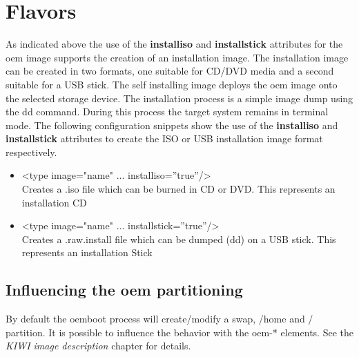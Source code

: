 \section{Flavors}

As indicated above the use of the \textbf{installiso} and \textbf{installstick}
 attributes for the oem image supports the creation of an installation image.
The installation image can be created in two formats, one suitable for
CD/DVD media and a second suitable for a USB stick. The self installing
image deploys the oem image onto the selected storage device. The
installation process is a simple image dump using the dd command. During
this process the target system
remains in terminal mode. The following configuration snippets show the 
use of the \textbf{installiso} and \textbf{installstick} attributes
to create the ISO or USB installation image format respectively.

\begin{itemize}
\item <type image="name" ... installiso=''true''/>\\
      Creates a .iso file which can be burned in CD or DVD. This
      represents an installation CD
\item <type image="name" ... installstick=''true''/>\\
      Creates a .raw.install file which can be dumped (dd) on a
      USB stick. This represents an installation Stick
\end{itemize}

\subsection{Influencing the oem partitioning}

By default the oemboot process will create/modify a swap, /home and /
partition. It is possible to influence the behavior with the
oem-* elements. See the \textit{KIWI image description} chapter for details.


